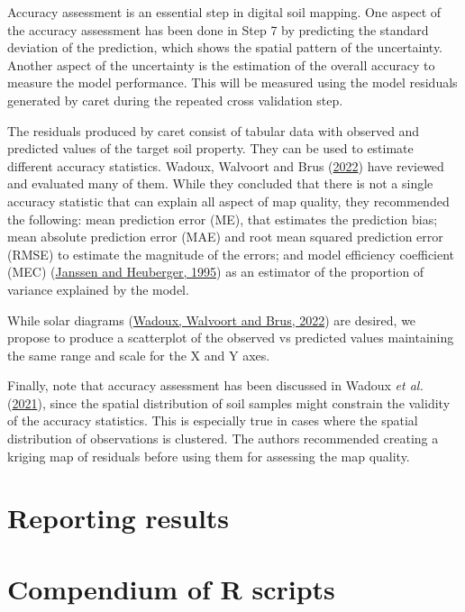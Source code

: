 \documentclass[
  10pt,
  b5paper,
  oneside]{book}
\begin{document}
Accuracy assessment is an essential step in digital soil mapping. One aspect of the accuracy assessment has been done in Step 7 by predicting the standard deviation of the prediction, which shows the spatial pattern of the uncertainty. Another aspect of the uncertainty is the estimation of the overall accuracy to measure the model performance. This will be measured using the model residuals generated by caret during the repeated cross validation step.

The residuals produced by caret consist of tabular data with observed and predicted values of the target soil property. They can be used to estimate different accuracy statistics. Wadoux, Walvoort and Brus (\protect\hyperlink{ref-Wadoux2022}{2022}) have reviewed and evaluated many of them. While they concluded that there is not a single accuracy statistic that can explain all aspect of map quality, they recommended the following:
mean prediction error (ME), that estimates the prediction bias;
mean absolute prediction error (MAE) and root mean squared prediction error (RMSE) to estimate the magnitude of the errors; and
model efficiency coefficient (MEC) (\protect\hyperlink{ref-Janssen1995}{Janssen and Heuberger, 1995}) as an estimator of the proportion of variance explained by the model.

While solar diagrams (\protect\hyperlink{ref-Wadoux2022}{Wadoux, Walvoort and Brus, 2022}) are desired, we propose to produce a scatterplot of the observed vs predicted values maintaining the same range and scale for the X and Y axes.

Finally, note that accuracy assessment has been discussed in Wadoux \emph{et al.} (\protect\hyperlink{ref-Wadoux2021}{2021}), since the spatial distribution of soil samples might constrain the validity of the accuracy statistics. This is especially true in cases where the spatial distribution of observations is clustered. The authors recommended creating a kriging map of residuals before using them for assessing the map quality.

\hypertarget{reporting-results}{%
\chapter{Reporting results}\label{reporting-results}}

\hypertarget{compendium-of-r-scripts}{%
\chapter{Compendium of R scripts}\label{compendium-of-r-scripts}}
\end{document}
